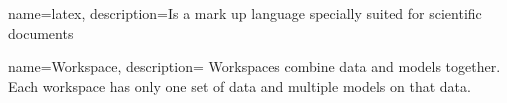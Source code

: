 {
    name=latex,
    description={Is a mark up language specially suited for scientific documents}
}

{
    name=Workspace,
    description={%
        Workspaces combine data and models together. Each workspace has only one set of data and multiple models on that data.
    }
}